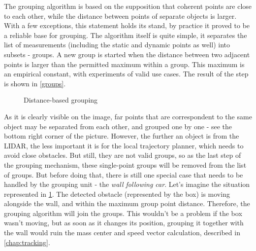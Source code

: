 The grouping algorithm is based on the supposition that coherent points are close to each other, while the distance between points of separate objects is larger. With a few exceptions, this statement holds its stand, by practice it proved to be a reliable base for grouping. The algorithm itself is quite simple, it separates the list of measurements (including the static and dynamic points as well) into subsets - groups. A new group is started when the distance between two adjacent points is larger than the permitted maximum within a group. This maximum is an empirical constant, with experiments of valid use cases. The result of the step is shown in \ref{groups}.

\begin{figure}[!ht]
    \centering
    \caption{Distance-based grouping}
    \label{wall_following_car}
\end{figure}

As it is clearly visible on the image, far points that are correspondent to the same object may be separated from each other, and grouped one by one - see the bottom right corner of the picture. However, the further an object is from the LIDAR, the less important it is for the local trajectory planner, which needs to avoid close obstacles. But still, they are not valid groups, so as the last step of the grouping mechanism, these single-point groups will be removed from the list of groups. But before doing that, there is still one special case that needs to be handled by the grouping unit - the \textit{wall following car}. Let's imagine the situation represented in \ref{wall_following_car}. The detected obstacle (represented by the box) is moving alongside the wall, and within the maximum group point distance. Therefore, the grouping algorithm will join the groups. This wouldn't be a problem if the box wasn't moving, but as soon as it changes its position, grouping it together with the wall would ruin the mass center and speed vector calculation, described in \ref{chap:tracking}.

